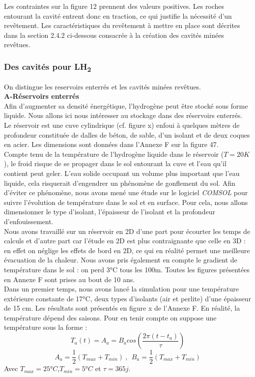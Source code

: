 \documentclass[11pt,french,a4paper]{article}
\begin{document}
Les contraintes sur la figure 12 prennent des valeurs positives. Les roches entourant la cavité entrent donc en traction, ce qui justifie la nécessité d’un revêtement. Les caractéristiques du revêtement à mettre en place sont décrites dans la section 2.4.2 ci-dessous consacrée à la création des cavités minées revêtues.



\subsubsection{Des cavités pour LH\textsubscript{2}}
On distingue les reservoirs enterrés et les cavités minées revêtues.\\

\textbf{A-Réservoirs enterrés}\\
Afin d’augmenter sa densité énergétique, l'hydrogène peut être stocké sous forme liquide. Nous allons ici nous intéresser au stockage dans des réservoirs enterrés. Le réservoir est une cuve cylindrique (cf. figure x) enfoui à quelques mètres de profondeur constituée de dalles de béton, de sable, d’un isolant et de deux coques en acier. Les dimensions sont données dans l'Annexe F sur la figure 47.\\

Compte tenu de la température de l’hydrogène liquide dans le réservoir ($T = 20K$), le froid risque de se propager dans le sol entourant la cuve et l’eau qu’il contient peut geler. L’eau solide occupant un volume plus important que l’eau liquide, cela risquerait d’engendrer un phénomène de gonflement du sol. Afin d’éviter ce phénomène, nous avons mené une étude sur le logiciel \emph{COMSOL} pour suivre l’évolution de température dans le sol et en surface. Pour cela, nous allons dimensionner le type d'isolant, l'épaisseur de l'isolant et la profondeur d'enfouissement.\\

Nous avons travaillé sur un réservoir en 2D d’une part pour écourter les temps de calculs et d’autre part car l’étude en 2D est plus contraignante que celle en 3D : en effet on néglige les effets de bord en 2D, ce qui en réalité permet une meilleure évacuation de la chaleur. Nous avons pris également en compte le gradient de température dans le sol : on perd 3°C tous les 100m. Toutes les figures présentées en Annexe F sont prises au bout de 10 ans.  \\


Dans un premier temps, nous avons lancé la simulation pour une température extérieure constante de 17°C, deux types d’isolants (air et perlite) d’une épaisseur de 15 cm.  
Les résultats sont présentés en figure x de l'Annexe F. En réalité, la température dépend des saisons. Pour en tenir compte on suppose une température sous la forme : $$T_a(t) = A_a=B_a cos(\frac{2\pi(t-t_a)}{\tau})$$ $$A_a=\frac{1}{2}(T_{max} + T_{min}) \ , \ \ B_a =\frac{1}{2} ( T_{max} + T_{min})$$
Avec $T_{max}=25°C$,$T_{min}=5°C$ et $\tau=365 j$.
\end{document}
